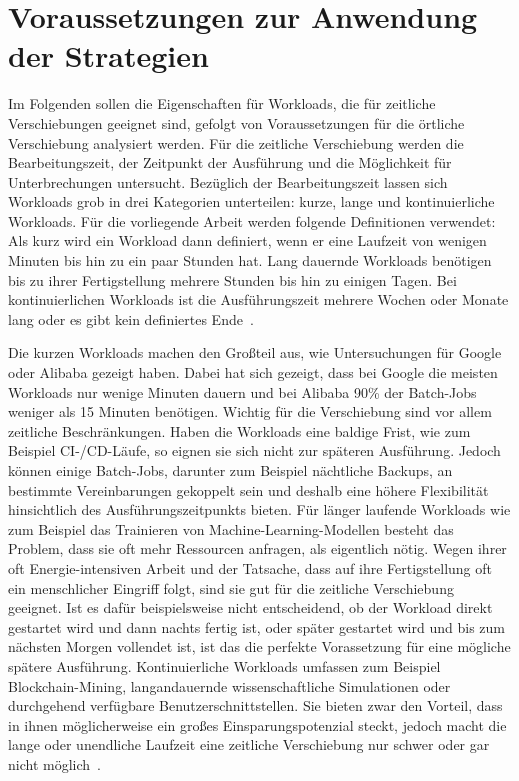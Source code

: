 \section{Voraussetzungen zur Anwendung der Strategien}
Im Folgenden sollen die Eigenschaften für Workloads, die für zeitliche Verschiebungen geeignet sind, gefolgt von Voraussetzungen für die örtliche Verschiebung analysiert werden.
Für die zeitliche Verschiebung werden die Bearbeitungszeit, der Zeitpunkt der Ausführung und die Möglichkeit für Unterbrechungen untersucht.
Bezüglich der Bearbeitungszeit lassen sich Workloads grob in drei Kategorien unterteilen: kurze, lange und kontinuierliche Workloads.
Für die vorliegende Arbeit werden folgende Definitionen verwendet:
Als kurz wird ein Workload dann definiert, wenn er eine Laufzeit von wenigen Minuten bis hin zu ein paar Stunden hat.
Lang dauernde Workloads benötigen bis zu ihrer Fertigstellung mehrere Stunden bis hin zu einigen Tagen.
Bei kontinuierlichen Workloads ist die Ausführungszeit mehrere Wochen oder Monate lang oder es gibt kein definiertes Ende~\cite{Wiesner.2021}.

Die kurzen Workloads machen den Großteil aus, wie Untersuchungen für Google oder Alibaba gezeigt haben.
Dabei hat sich gezeigt, dass bei Google die meisten Workloads nur wenige Minuten dauern und bei Alibaba 90\% der Batch-Jobs weniger als 15 Minuten benötigen.
Wichtig für die Verschiebung sind vor allem zeitliche Beschränkungen.
Haben die Workloads eine baldige Frist, wie zum Beispiel CI-/CD-Läufe, so eignen sie sich nicht zur späteren Ausführung.
Jedoch können einige Batch-Jobs, darunter zum Beispiel nächtliche Backups, an bestimmte Vereinbarungen gekoppelt sein und deshalb eine höhere Flexibilität hinsichtlich des Ausführungszeitpunkts bieten.
Für länger laufende Workloads wie zum Beispiel das Trainieren von Machine-Learning-Modellen besteht das Problem, dass sie oft mehr Ressourcen anfragen, als eigentlich nötig.
Wegen ihrer oft Energie-intensiven Arbeit und der Tatsache, dass auf ihre Fertigstellung oft ein menschlicher Eingriff folgt, sind sie gut für die zeitliche Verschiebung geeignet.
Ist es dafür beispielsweise nicht entscheidend, ob der Workload direkt gestartet wird und dann nachts fertig ist, oder später gestartet wird und bis zum nächsten Morgen vollendet ist, ist das die perfekte Vorassetzung für eine mögliche spätere Ausführung.
Kontinuierliche Workloads umfassen zum Beispiel Blockchain-Mining, langandauernde wissenschaftliche Simulationen oder durchgehend verfügbare Benutzerschnittstellen.
Sie bieten zwar den Vorteil, dass in ihnen möglicherweise ein großes Einsparungspotenzial steckt, jedoch macht die lange oder unendliche Laufzeit eine zeitliche Verschiebung nur schwer oder gar nicht möglich~\cite{Wiesner.2021}.

